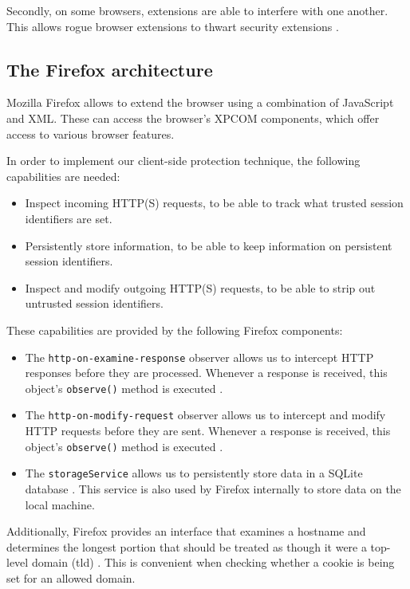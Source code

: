 Secondly, on some browsers, extensions are able to interfere with one another. This allows rogue browser extensions to thwart security extensions \cite{Barth2010}.

\subsection{The Firefox architecture}

Mozilla Firefox allows to extend the browser using a combination of JavaScript and XML. These can access the browser's XPCOM components, which offer access to various browser features.

In order to implement our client-side protection technique, the following capabilities are needed:
\begin{itemize}
	\item Inspect incoming HTTP(S) requests, to be able to track what trusted session identifiers are set.
	\item Persistently store information, to be able to keep information on persistent session identifiers.
	\item Inspect and modify outgoing HTTP(S) requests, to be able to strip out untrusted session identifiers.
\end{itemize}
These capabilities are provided by the following Firefox components:
\begin{itemize}
	\item The \texttt{http-on-examine-response} observer allows us to intercept HTTP responses before they are processed. Whenever a response is received, this object's \texttt{observe()} method is executed \cite{MozillaObservers}.
	\item The \texttt{http-on-modify-request} observer allows us to intercept and modify HTTP requests before they are sent. Whenever a response is received, this object's \texttt{observe()} method is executed \cite{MozillaObservers}.
	\item The \texttt{storageService} allows us to persistently store data in a SQLite database \cite{MozillaStorage}. This service is also used by Firefox internally to store data on the local machine.
\end{itemize}

Additionally, Firefox provides an interface that examines a hostname and determines the longest portion that should be treated as though it were a top-level domain (\gls{tld}) \cite{MozillaDevelopers2010}. This is convenient when checking whether a cookie is being set for an allowed domain.


